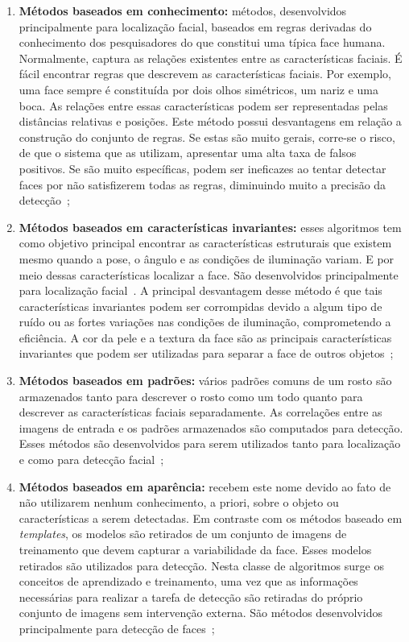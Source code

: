 	\begin{enumerate}
		\item \textbf{Métodos baseados em conhecimento:} métodos, desenvolvidos principalmente para localização facial, baseados em regras derivadas do conhecimento dos pesquisadores do que constitui uma típica face humana. Normalmente, captura as relações existentes entre as características faciais. É fácil encontrar regras que descrevem as características faciais. Por exemplo, uma face sempre é constituída por dois olhos simétricos, um nariz e uma boca. As relações entre essas características podem ser representadas pelas distâncias relativas e posições. Este método possui desvantagens em relação a construção do conjunto de regras. Se estas são muito gerais, corre-se o risco, de que o sistema que as utilizam, apresentar uma alta taxa de falsos positivos. Se são muito específicas, podem ser ineficazes ao tentar detectar faces por não satisfizerem todas as regras, diminuindo muito a precisão da detecção~\cite{yang,lopes};

		\item \textbf{Métodos baseados em características invariantes:} esses algoritmos tem como objetivo principal encontrar as características estruturais que existem mesmo quando a pose, o ângulo e as condições de iluminação variam. E por meio dessas características localizar a face. São desenvolvidos principalmente para localização facial~\cite{yang}. A principal desvantagem desse método é que tais características invariantes podem ser corrompidas devido a algum tipo de ruído ou as fortes variações nas condições de iluminação, comprometendo a eficiência. A cor da pele e a textura da face são as principais características invariantes que podem ser utilizadas para separar a face de outros objetos~\cite{lopes};

		\item \textbf{Métodos baseados em padrões:} vários padrões comuns de um rosto são armazenados tanto para descrever o rosto como um todo quanto para descrever as características faciais separadamente. As correlações entre as imagens de entrada e os padrões armazenados são computados para detecção. Esses métodos são desenvolvidos para serem utilizados tanto para localização e como para detecção facial~\cite{yang};

		\item \textbf{Métodos baseados em aparência:} recebem este nome devido ao fato de não utilizarem nenhum conhecimento, a priori, sobre o objeto ou características a serem detectadas. Em contraste com os métodos baseado em \textit{templates}, os modelos são retirados de um conjunto de imagens de treinamento que devem capturar a variabilidade da face. Esses modelos retirados são utilizados para detecção. Nesta classe de algoritmos surge os conceitos de aprendizado e treinamento, uma vez que as informações necessárias para realizar a tarefa de detecção são retiradas do próprio conjunto de imagens sem intervenção externa. São métodos desenvolvidos principalmente para detecção de faces~\cite{yang, lopes};

	\end{enumerate}

